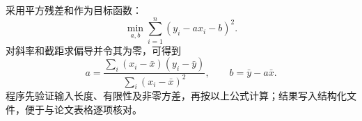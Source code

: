 采用平方残差和作为目标函数：
\begin{equation}\min_{a,b}\sum_{i=1}^{n}(y_i-a x_i-b)^2.\end{equation}
对斜率和截距求偏导并令其为零，可得到
\begin{equation}
a=\frac{\sum_i(x_i-\bar{x})(y_i-\bar{y})}{\sum_i(x_i-\bar{x})^2},\qquad
b=\bar{y}-a\bar{x}.
\end{equation}
程序先验证输入长度、有限性及非零方差，再按以上公式计算；结果写入结构化文件，便于与论文表格逐项核对。
